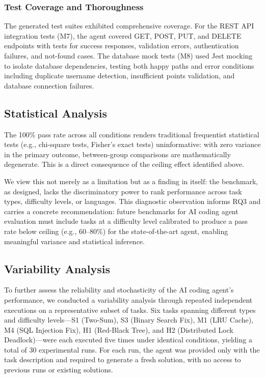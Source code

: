 \documentclass[conference]{IEEEtran}
\begin{document}
\subsubsection{Test Coverage and Thoroughness}

The generated test suites exhibited comprehensive coverage. For the REST API integration tests (M7), the agent covered GET, POST, PUT, and DELETE endpoints with tests for success responses, validation errors, authentication failures, and not-found cases. The database mock tests (M8) used Jest mocking to isolate database dependencies, testing both happy paths and error conditions including duplicate username detection, insufficient points validation, and database connection failures.

\subsection{Statistical Analysis}

The 100\% pass rate across all conditions renders traditional frequentist statistical tests (e.g., chi-square tests, Fisher's exact tests) uninformative: with zero variance in the primary outcome, between-group comparisons are mathematically degenerate. This is a direct consequence of the ceiling effect identified above.

We view this not merely as a limitation but as a finding in itself: the benchmark, as designed, lacks the discriminatory power to rank performance across task types, difficulty levels, or languages. This diagnostic observation informs RQ3 and carries a concrete recommendation: future benchmarks for AI coding agent evaluation must include tasks at a difficulty level calibrated to produce a pass rate below ceiling (e.g., 60--80\%) for the state-of-the-art agent, enabling meaningful variance and statistical inference.

\subsection{Variability Analysis}\label{sec:variability}

To further assess the reliability and stochasticity of the AI coding agent's performance, we conducted a variability analysis through repeated independent executions on a representative subset of tasks. Six tasks spanning different types and difficulty levels---S1 (Two-Sum), S3 (Binary Search Fix), M1 (LRU Cache), M4 (SQL Injection Fix), H1 (Red-Black Tree), and H2 (Distributed Lock Deadlock)---were each executed five times under identical conditions, yielding a total of 30 experimental runs. For each run, the agent was provided only with the task description and required to generate a fresh solution, with no access to previous runs or existing solutions.
\end{document}
